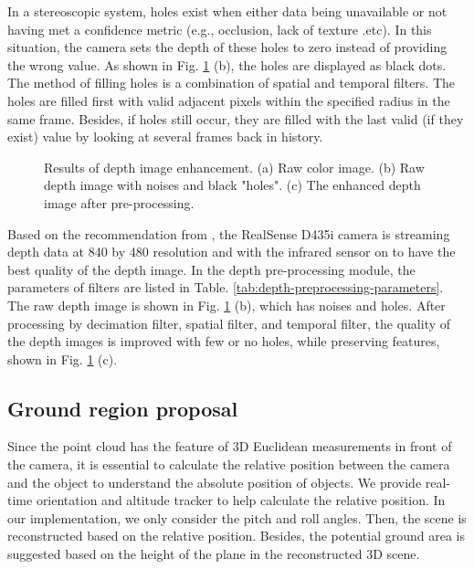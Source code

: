 \documentclass{ieeeaccess}
\begin{document}
In a stereoscopic system, holes exist when either data being unavailable or not having met a confidence metric (e.g., occlusion, lack of texture .etc). In this situation, the camera sets the depth of these holes to zero instead of providing the wrong value. As shown in Fig. \ref{fig:depth-pre-processing} (b), the holes are displayed as black dots. The method of filling holes is a combination of spatial and temporal filters. The holes are filled first with valid adjacent pixels within the specified radius in the same frame. Besides, if holes still occur, they are filled with the last valid (if they exist) value by looking at several frames back in history.  
\begin{figure}[t]
    \centering
    \caption{Results of depth image enhancement. (a) Raw color image. (b) Raw depth image with noises and black "holes". (c) The enhanced depth image after pre-processing.}%
    \label{fig:depth-pre-processing}
\end{figure}

Based on the recommendation from \cite{IEEEexample:grunnet2018depth}, the RealSense D435i camera is streaming depth data at 840 by 480 resolution and with the infrared sensor on to have the best quality of the depth image. In the depth pre-processing module, the parameters of filters are listed in Table. \ref{tab:depth-preprocessing-parameters}. The raw depth image is shown in Fig. \ref{fig:depth-pre-processing} (b), which has noises and holes. After processing by decimation filter, spatial filter, and temporal filter, the quality of the depth images is improved with few or no holes, while preserving features, shown in Fig. \ref{fig:depth-pre-processing} (c).

\subsection{Ground region proposal}
Since the point cloud has the feature of 3D Euclidean measurements in front of the camera, it is essential to calculate the relative position between the camera and the object to understand the absolute position of objects. We provide real-time orientation and altitude tracker to help calculate the relative position. In our implementation, we only consider the pitch and roll angles. Then, the scene is reconstructed based on the relative position. Besides, the potential ground area is suggested based on the height of the plane in the reconstructed 3D scene.
\end{document}
